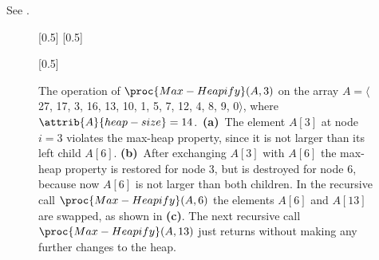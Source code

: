 See .
\begin{figure}[htb]
    \captionsetup[subfigure]{}
    \subcaptionbox{\label{fig:6.1-2a}}[0.5\textwidth]{}
    \subcaptionbox{\label{fig:6.1-2b}}[0.5\textwidth]{}
    \par\vspace{5mm}
    \subcaptionbox{\label{fig:6.1-2c}}[0.5\textwidth]{}
    \caption{The operation of $\proc{Max-Heapify}(A,3)$ on the array $A=\langle$27, 17, 3, 16, 13, 10, 1, 5, 7, 12, 4, 8, 9, 0$\rangle$, where $\attrib{A}{heap-size}=14$.\,
    \textbf{(a)}\, The element $A[3]$ at node $i=3$ violates the max-heap property, since it is not larger than its left child $A[6]$.
    \textbf{(b)}\, After exchanging $A[3]$ with $A[6]$ the max-heap property is restored for node 3, but is destroyed for node 6, because now $A[6]$ is not larger than both children.
    In the recursive call $\proc{Max-Heapify}(A,6)$ the elements $A[6]$ and $A[13]$ are swapped, as shown in \textbf{(c)}.
    The next recursive call $\proc{Max-Heapify}(A,13)$ just returns without making any further changes to the heap.} \label{fig:6.1-2}
\end{figure}
